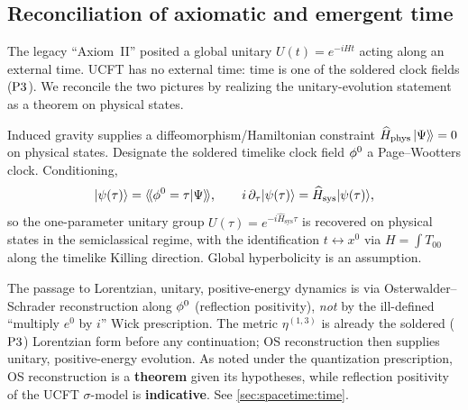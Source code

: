 \subsection{Reconciliation of axiomatic and emergent time}
\label{sec:axioms:time}

The legacy ``Axiom~II'' posited a global unitary $U(t)=e^{-iHt}$ acting along
an external time. UCFT has no external time: time is one of the soldered
clock fields ($\textnormal{P3}$). We reconcile the two pictures by realizing the
unitary-evolution statement as a theorem on physical states.

\begin{theorem}\label{thm:axioms:time}
Induced gravity supplies a diffeomorphism/Hamiltonian constraint
$\widehat H_{\mathrm{phys}}\,\lvert \Psi\rangle\!\rangle=0$ on physical states. Designate the
soldered timelike clock field $\phi^{0}$ a Page--Wootters clock. Conditioning,
\[
  \lvert \psi(\tau)\rangle=\langle\!\langle \phi^{0}=\tau\rvert\Psi\rangle\!\rangle,
  \qquad
  i\,\partial_\tau\lvert \psi(\tau)\rangle=\widehat H_{\mathrm{sys}}\lvert \psi(\tau)\rangle,
\]
so the one-parameter unitary group $U(\tau)=e^{-i\widehat H_{\mathrm{sys}}\tau}$
is recovered on physical states in the semiclassical regime, with the
identification $t\leftrightarrow x^0$ via
$H=\int T_{00}$ along the timelike Killing direction. Global hyperbolicity is
an assumption.
\end{theorem}

\begin{remark}\label{rem:axioms:os}
The passage to Lorentzian, unitary, positive-energy dynamics is via
Osterwalder--Schrader reconstruction along $\phi^{0}$ (reflection positivity),
\emph{not} by the ill-defined ``multiply $e^0$ by $i$'' Wick prescription.
The metric $\eta^{(1,3)}$ is already the soldered ($\textnormal{P3}$) Lorentzian form
before any continuation; OS reconstruction then supplies unitary,
positive-energy evolution. As noted under the quantization prescription, OS
reconstruction is a \textbf{theorem} given its hypotheses, while reflection
positivity of the UCFT $\sigma$-model is \textbf{indicative}. See
\autoref{sec:spacetime:time}.
\end{remark}
